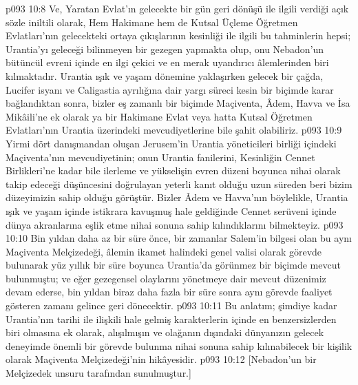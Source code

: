\vs p093 10:8 Ve, Yaratan Evlat’ın gelecekte bir gün geri dönüşü ile ilgili verdiği açık sözle iniltili olarak, Hem Hakimane hem de Kutsal Üçleme Öğretmen Evlatları’nın gelecekteki ortaya çıkışlarının kesinliği ile ilgili bu tahminlerin hepsi; Urantia’yı geleceği bilinmeyen bir gezegen yapmakta olup, onu Nebadon’un bütüncül evreni içinde en ilgi çekici ve en merak uyandırıcı âlemlerinden biri kılmaktadır. Urantia ışık ve yaşam dönemine yaklaşırken gelecek bir çağda, Lucifer isyanı ve Caligastia ayrılığına dair yargı süreci kesin bir biçimde karar bağlandıktan sonra, bizler eş zamanlı bir biçimde Maçiventa, Âdem, Havva ve İsa Mikâili’ne ek olarak ya bir Hakimane Evlat veya hatta Kutsal Öğretmen Evlatları’nın Urantia üzerindeki mevcudiyetlerine bile şahit olabiliriz.
\vs p093 10:9 Yirmi dört danışmandan oluşan Jerusem’in Urantia yöneticileri birliği içindeki Maçiventa’nın mevcudiyetinin; onun Urantia fanilerini, Kesinliğin Cennet Birlikleri’ne kadar bile ilerleme ve yükselişin evren düzeni boyunca nihai olarak takip edeceği düşüncesini doğrulayan yeterli kanıt olduğu uzun süreden beri bizim düzeyimizin sahip olduğu görüştür. Bizler Âdem ve Havva’nın böylelikle, Urantia ışık ve yaşam içinde istikrara kavuşmuş hale geldiğinde Cennet serüveni içinde dünya akranlarına eşlik etme nihai sonuna sahip kılındıklarını bilmekteyiz.
\vs p093 10:10 Bin yıldan daha az bir süre önce, bir zamanlar Salem’in bilgesi olan bu aynı Maçiventa Melçizedeği, âlemin ikamet halindeki genel valisi olarak görevde bulunarak yüz yıllık bir süre boyunca Urantia’da görünmez bir biçimde mevcut bulunmuştu; ve eğer gezegensel olaylarını yönetmeye dair mevcut düzenimiz devam ederse, bin yıldan biraz daha fazla bir süre sonra aynı görevde faaliyet gösteren zamanı gelince geri dönecektir.
\vs p093 10:11 Bu anlatım; şimdiye kadar Urantia’nın tarihi ile ilişkili hale gelmiş karakterlerin içinde en benzersizlerden biri olmasına ek olarak, alışılmışın ve olağanın dışındaki dünyanızın gelecek deneyimde önemli bir görevde bulunma nihai sonuna sahip kılınabilecek bir kişilik olarak Maçiventa Melçizedeği’nin hikâyesidir.
\vs p093 10:12 [Nebadon’un bir Melçizedek unsuru tarafından sunulmuştur.]
